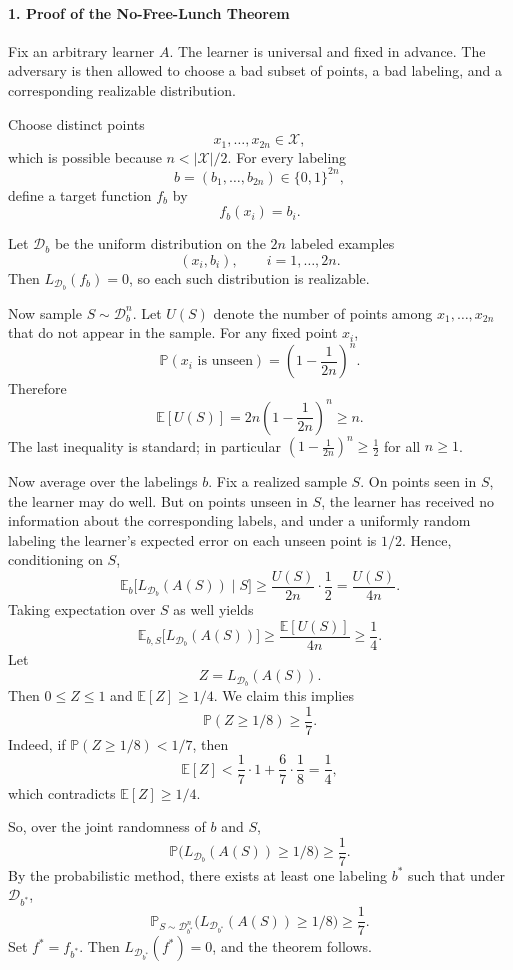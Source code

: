 \documentclass[11pt]{article}
\newcommand{\E}{\mathbb{E}}
\newcommand{\Pbb}{\mathbb{P}}
\begin{document}
\begin{solutionbox}
\paragraph{1. Proof of the No-Free-Lunch Theorem}

Fix an arbitrary learner $A$. The learner is universal and fixed in advance. The adversary is then allowed to choose a bad subset of points, a bad labeling, and a corresponding realizable distribution.

Choose distinct points
\[
x_1,\dots,x_{2n}\in \mathcal X,
\]
which is possible because $n<|\mathcal X|/2$. For every labeling
\[
b=(b_1,\dots,b_{2n})\in\{0,1\}^{2n},
\]
define a target function $f_b$ by
\[
f_b(x_i)=b_i.
\]

Let $\mathcal D_b$ be the uniform distribution on the $2n$ labeled examples
\[
(x_i,b_i), \qquad i=1,\dots,2n.
\]
Then $L_{\mathcal D_b}(f_b)=0$, so each such distribution is realizable.

Now sample $S\sim \mathcal D_b^n$. Let $U(S)$ denote the number of points among $x_1,\dots,x_{2n}$ that do not appear in the sample. For any fixed point $x_i$,
\[
\Pbb(x_i \text{ is unseen}) = \left(1-\frac1{2n}\right)^n.
\]
Therefore
\[
\E[U(S)] = 2n\left(1-\frac1{2n}\right)^n \ge n.
\]
The last inequality is standard; in particular $\left(1-\frac1{2n}\right)^n\ge \frac12$ for all $n\ge 1$.

Now average over the labelings $b$. Fix a realized sample $S$. On points seen in $S$, the learner may do well. But on points unseen in $S$, the learner has received no information about the corresponding labels, and under a uniformly random labeling the learner's expected error on each unseen point is $1/2$. Hence, conditioning on $S$,
\[
\E_b\bigl[L_{\mathcal D_b}(A(S))\mid S\bigr]
\ge
\frac{U(S)}{2n}\cdot \frac12
=
\frac{U(S)}{4n}.
\]
Taking expectation over $S$ as well yields
\[
\E_{b,S}\bigl[L_{\mathcal D_b}(A(S))\bigr]
\ge
\frac{\E[U(S)]}{4n}
\ge
\frac14.
\]
Let
\[
Z = L_{\mathcal D_b}(A(S)).
\]
Then $0\le Z\le 1$ and $\E[Z]\ge 1/4$. We claim this implies
\[
\Pbb(Z\ge 1/8)\ge \frac17.
\]
Indeed, if $\Pbb(Z\ge 1/8)<1/7$, then
\[
\E[Z]
<
\frac17\cdot 1 + \frac67\cdot \frac18
=
\frac14,
\]
which contradicts $\E[Z]\ge 1/4$.

So, over the joint randomness of $b$ and $S$,
\[
\Pbb\bigl(L_{\mathcal D_b}(A(S))\ge 1/8\bigr)\ge \frac17.
\]
By the probabilistic method, there exists at least one labeling $b^*$ such that under $\mathcal D_{b^*}$,
\[
\Pbb_{S\sim \mathcal D_{b^*}^n}\bigl(L_{\mathcal D_{b^*}}(A(S))\ge 1/8\bigr)\ge \frac17.
\]
Set $f^*=f_{b^*}$. Then $L_{\mathcal D_{b^*}}(f^*)=0$, and the theorem follows.


\end{solutionbox}
\end{document}

